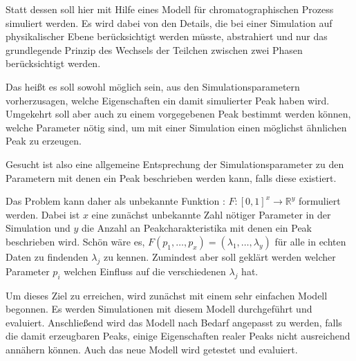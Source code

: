 Statt dessen soll hier mit Hilfe eines Modell für chromatographischen Prozess simuliert werden. Es wird dabei von den Details, die bei einer Simulation auf physikalischer Ebene berücksichtigt werden müsste, abstrahiert und nur das grundlegende Prinzip des Wechsels der Teilchen zwischen zwei Phasen berücksichtigt werden.



Das heißt es soll sowohl möglich sein, aus den Simulationsparametern vorherzusagen, welche Eigenschaften ein damit simulierter Peak haben wird. Umgekehrt soll aber auch zu einem vorgegebenen Peak bestimmt werden können, welche Parameter nötig sind, um mit einer Simulation einen möglichst ähnlichen Peak zu erzeugen.

Gesucht ist also eine allgemeine Entsprechung der Simulationsparameter zu den Parametern mit denen ein Peak beschrieben werden kann, falls diese existiert. 

Das Problem kann daher als unbekannte Funktion : $F: [0,1] ^ x \rightarrow \mathbb{R}^y$ formuliert werden. Dabei ist $x$ eine zunächst unbekannte Zahl nötiger Parameter in der Simulation und $y$ die Anzahl an Peakcharakteristika mit denen ein Peak beschrieben wird. Schön wäre es, $F(p_1, \ldots, p_x) = (\lambda_1, \ldots, \lambda_y)$ für alle in echten Daten zu findenden $\lambda_j$ zu kennen. Zumindest aber soll geklärt werden welcher Parameter $p_i$ welchen Einfluss auf die verschiedenen $\lambda_j$ hat. 



Um dieses Ziel zu erreichen, wird zunächst mit einem sehr einfachen Modell begonnen. Es werden Simulationen mit diesem Modell durchgeführt und evaluiert. Anschließend wird das Modell nach Bedarf angepasst zu werden, falls die damit erzeugbaren Peaks, einige Eigenschaften realer Peaks nicht ausreichend annähern können. Auch das neue Modell wird getestet und evaluiert.

